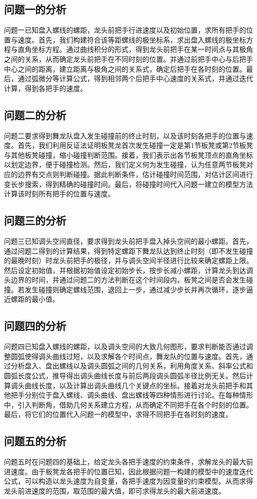 \documentclass[../main.tex]{subfiles}
\begin{document}
  \subsection{问题一的分析}
  问题一已知盘入螺线的螺距，龙头前把手行进速度以及初始位置，求所有把手的位置与速度。首先，我们构建符合该等距螺线的极坐标系，求出盘入螺线的极坐标方程与直角坐标方程。通过曲线积分的形式，得到龙头前把手在某一时间点与其极角之间的关系，从而确定龙头前把手在不同时刻的位置。并通过前把手中心与后把手中心之间的距离，建立距离与极角之间的关系式，确定后把手在各时刻的位置。最后，通过弧微分等计算公式，得到相邻两个后把手中心速度的关系式，并通过迭代计算，得到各把手的速度。
  \subsection{问题二的分析}
  问题二要求得到舞龙队盘入发生碰撞前的终止时刻，以及该时刻各把手的位置与速度。首先，我们利用反证法证明板凳龙首次发生碰撞一定是第1节板凳或第2节板凳与其他板凳碰撞，缩小碰撞判断范围。接着，我们表示出各节板凳顶点的直角坐标以划定边界，便于碰撞检测。然后，我们定义何为发生碰撞，认为任意两节板凳对应的边界有交点则判断碰撞。据此判断条件，估计碰撞时间范围，对估计区间进行变长步搜索，得到精确的碰撞时间。最后，将碰撞时间代入问题一建立的模型方法计算该时刻所有把手的位置与速度。
  \subsection{问题三的分析}
  问题三已知调头空间直径，要求得到龙头前把手盘入掉头空间的最小螺距。首先，通过问题二得到的计算结果，得到特定螺距下舞龙队达到终止时刻（即不发生碰撞的最晚时刻）时龙头前把手的极径，并与调头空间半径进行比较来确定螺距上限。然后设定初始值，并根据初始值设定初始步长，按步长减小螺距，计算龙头到达调头边界的时间，并通过问题二的方法判断在这个时间段内，板凳之间是否会发生碰撞。若发生碰撞则确定螺线范围，退回上一步，通过减少步长并再次循环，逐步逼近螺距的最小值。
  \subsection{问题四的分析}
  问题四已知盘入螺线的螺距，以及调头空间的大致几何图形，要求判断能否通过调整圆弧使得调头曲线过短，以及求解各个时间点，舞龙队的位置与速度。首先，通过分析盘入、盘出螺线以及调头圆弧之间的几何关系，利用角度关系、斜率公式和圆弧长度公式，推导得出调头曲线长度与前后两段调头圆弧半径比例无关。然后计算调头曲线长度，以及计算出调头曲线几个关键点的坐标。接着对龙头前把手和其他把手分别位于盘入螺线、调头曲线、盘出螺线等四种情形进行讨论。在每种情形中，引入判断角，借助几何关系建立方程，从而确定不同把手在各个时刻的位置。最后，将它们的位置代入问题一的模型中，求得不同把手在各时刻的速度。
  \subsection{问题五的分析}
  问题五时在问题四的基础上，给定龙头各把手速度的约束条件，求解龙头的最大前进速度。由于板凳龙各把手的位置已知，因此根据问题一构建的模型中的速度迭代公式，可以构造以龙头速度为自变量，各把手速度为因变量的约束模型。从而求得龙头前进速度的范围，取范围的最大值，即可求得龙头的最大前进速度。
  
\end{document}
